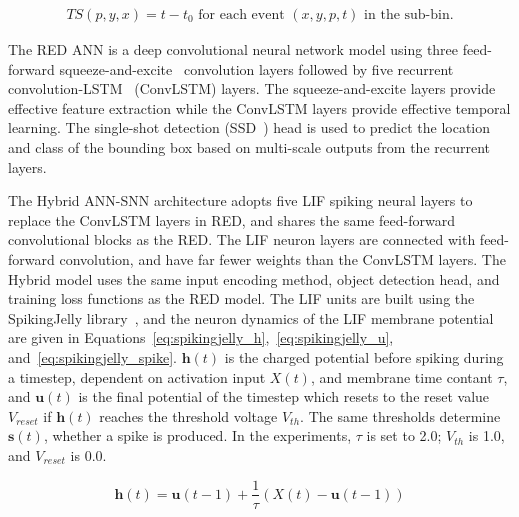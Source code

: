 \begin{equation}
\begin{aligned}
TS(p, y, x)=t-t_{0} \text { for each event }(x, y, p, t) \text { in the sub-bin.}
\end{aligned}
\label{eq:timesurfaces}
\end{equation}

The RED ANN \cite{Perot2020} is a deep convolutional neural network model using three feed-forward squeeze-and-excite~\cite{hu18squeeze} convolution layers followed by five recurrent convolution-LSTM~\cite{shi15convlstm} (ConvLSTM) layers. The squeeze-and-excite layers provide effective feature extraction while the ConvLSTM layers provide effective temporal learning.
The single-shot detection (SSD~\cite{Liu_2016}) head is used to predict the location and class of the bounding box based on multi-scale outputs from the recurrent layers. 
        
The Hybrid ANN-SNN architecture adopts five LIF spiking neural layers to replace the ConvLSTM layers in RED, and shares the same feed-forward convolutional blocks as the RED. The LIF neuron layers are connected with feed-forward convolution, and have far fewer weights than the ConvLSTM layers.
The Hybrid model uses the same input encoding method, object detection head, and training loss functions as the RED model. The LIF units are built using the SpikingJelly library~\cite{SpikingJelly}, and the neuron dynamics of the LIF membrane potential are given in Equations~\ref{eq:spikingjelly_h},~\ref{eq:spikingjelly_u}, and~\ref{eq:spikingjelly_spike}. $\mathbf{h}(t)$ is the charged potential before spiking during a timestep, dependent on activation input $X(t)$, and membrane time contant $\tau$, and $\mathbf{u}(t)$ is the final potential of the timestep which resets to the reset value $V_{reset}$ if $\mathbf{h}(t)$ reaches the threshold voltage $V_{th}$. The same thresholds determine $\mathbf{s}(t)$, whether a spike is produced. In the experiments, $\tau$ is set to 2.0; $V_{th}$ is 1.0, and $V_{reset}$ is 0.0.

\begin{equation}
    \mathbf{h}(t) = \mathbf{u}(t-1) + \frac{1}{\tau}(X(t) - \mathbf{u}(t-1))
    \label{eq:spikingjelly_h}
\end{equation}

